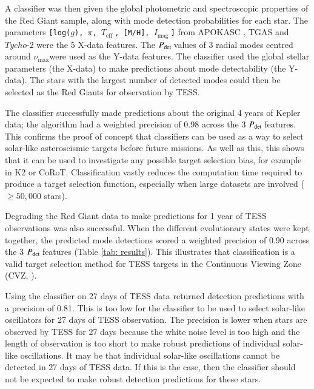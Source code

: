 \documentclass[a4paper,fleqn,usenatbib,useAMS]{mnras}
\newcommand{\numax}{\ensuremath{\nu_{\textrm{max}}}}
\newcommand{\teff}{\ensuremath{T_{\textrm{eff}}\:}}
\newcommand{\pdet}{\ensuremath{P_{\rm det}\:}}
\newcommand{\imag}{\ensuremath{I_{\textrm{mag}}\:}}
\begin{document}
A classifier was then given the global photometric and spectroscopic properties of the Red Giant sample, along with mode detection probabilities for each star. The parameters \texttt{[log($g$), $\pi$, \teff, [M/H], \imag]} from APOKASC \citep{pinsonneault_apokasc_2014}, TGAS \citep{gaia_collaboration_gaia_2016} and $Tycho$-2 \citep{hog_tycho-2_2000} were the 5 X-data features. The \pdet values of 3 radial modes centred around \numax were used as the Y-data features. %
The classifier used the global stellar parameters (the X-data) to make predictions about mode detectability (the Y-data). The stars with the largest number of detected modes could then be selected as the Red Giants for observation by TESS. 

The classifier successfully made predictions about the original 4 years of Kepler data; the algorithm had a weighted precision of 0.98 across the 3 \pdet features. This confirms the proof of concept that classifiers can be used as a way to select solar-like asteroseismic targets before future missions. As well as this, this shows that it can be used to investigate any possible target selection bias, for example in K2 or CoRoT. Classification vastly reduces the computation time required to produce a target selection function, especially when large datasets are involved ($\geq50,000$ stars).  

Degrading the Red Giant data to make predictions for 1 year of TESS observations was also successful. When the different evolutionary states were kept together, the predicted mode detections scored a weighted precision of 0.90 across the 3 \pdet features (Table \ref{tab: results}). This illustrates that classification is a valid target selection method for TESS targets in the Continuous Viewing Zone (CVZ, \citep{ricker_transiting_2014}).

Using the classifier on 27 days of TESS data returned detection predictions with a precision of 0.81. This is too low for the classifier to be used to select solar-like oscillators for 27 days of TESS observation. The precision is lower when stars are observed by TESS for 27 days because the white noise level is too high and the length of observation is too short to make robust predictions of individual solar-like oscillations. It may be that individual solar-like oscillations cannot be detected in 27 days of TESS data. If this is the case, then the classifier should not be expected to make robust detection predictions for these stars.
\end{document}
